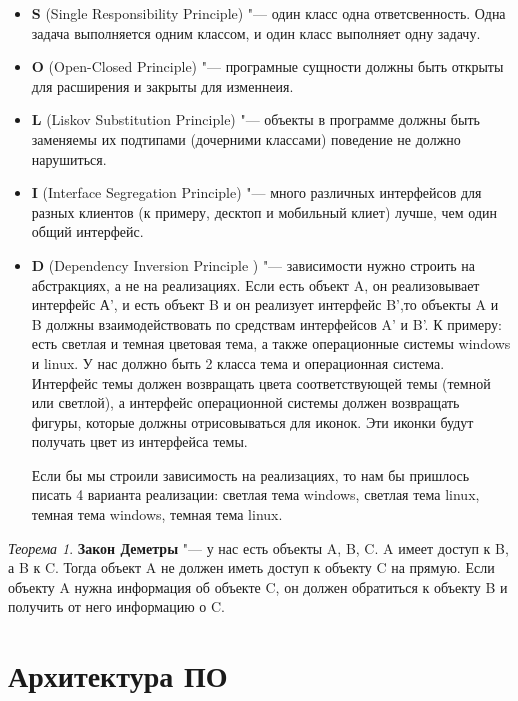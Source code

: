 \documentclass[bachelor, och, pract]{SCWorks}
\theoremstyle{remark}
\newtheorem{theorem}{Теорема}
\begin{document}
    \begin{itemize}[label=$\bullet$]
        \item \textbf{S} (Single Responsibility Principle) "--- один класс одна ответсвенность. Одна задача выполняется одним классом, и один класс выполняет одну задачу.
        \item  \textbf{O} (Open-Closed Principle) "--- програмные сущности должны быть открыты для расширения и закрыты для изменнеия.
        \item  \textbf{L} (Liskov Substitution Principle) "--- объекты в программе должны быть заменяемы их подтипами (дочерними классами) поведение не должно нарушиться.
        \item \textbf{I} (Interface Segregation Principle) "--- много различных интерфейсов для разных клиентов (к примеру, десктоп и мобильный клиет) лучше, чем один общий интерфейс.
        \item \textbf{D} (Dependency Inversion Principle ) "---  зависимости нужно строить на абстракциях, а не на реализациях. Если есть объект A, он реализовывает интерфейс А', и есть объект B и он реализует интерфейс B',то объекты A и B должны взаимодействовать по средствам интерфейсов A' и B'. К примеру: есть светлая и темная цветовая тема, а также операционные системы windows и linux. У нас должно быть 2 класса тема и операционная система. Интерфейс темы должен возвращать цвета соответствующей темы (темной или светлой), а интерфейс операционной системы должен возвращать фигуры, которые должны отрисовываться для иконок. Эти иконки будут получать цвет из интерфейса темы. 

        Если бы мы строили зависимость на реализациях, то нам бы пришлось писать 4 варианта реализации: светлая тема windows, светлая тема linux, темная тема windows, темная тема linux.  
    \end{itemize}
    
    \begin{theorem} 
        \textbf{Закон Деметры} "---  у нас есть объекты A, B, C. A имеет доступ к B, а B к C. Тогда объект A не должен иметь доступ к объекту C на прямую. Если объекту A нужна информация об объекте C, он должен обратиться к объекту B и получить от него информацию о C. 
    \end{theorem}



    
    \section{Архитектура ПО}
    
\end{document}
